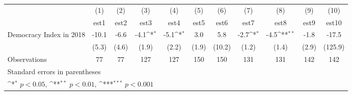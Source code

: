 {
\def\sym#1{\ifmmode^{#1}\else\(^{#1}\)\fi}
\begin{tabular}{l*{10}{c}}
\hline\hline
                    &\multicolumn{1}{c}{(1)}         &\multicolumn{1}{c}{(2)}         &\multicolumn{1}{c}{(3)}         &\multicolumn{1}{c}{(4)}         &\multicolumn{1}{c}{(5)}         &\multicolumn{1}{c}{(6)}         &\multicolumn{1}{c}{(7)}         &\multicolumn{1}{c}{(8)}         &\multicolumn{1}{c}{(9)}         &\multicolumn{1}{c}{(10)}         \\
                    &        est1         &        est2         &        est3         &        est4         &        est5         &        est6         &        est7         &        est8         &        est9         &       est10         \\
\hline
Democracy Index in 2018&       -10.1         &        -6.6         &        -4.1\sym{*}  &        -5.1\sym{*}  &         3.0         &         5.8         &        -2.7\sym{*}  &        -4.5\sym{**} &        -1.8         &       -17.5         \\
                    &       (5.3)         &       (4.6)         &       (1.9)         &       (2.2)         &       (1.9)         &      (10.2)         &       (1.2)         &       (1.4)         &       (2.9)         &     (125.9)         \\
\hline
Observations        &          77         &          77         &         127         &         127         &         150         &         150         &         131         &         131         &         142         &         142         \\
\hline\hline
\multicolumn{11}{l}{\footnotesize Standard errors in parentheses}\\
\multicolumn{11}{l}{\footnotesize \sym{*} \(p<0.05\), \sym{**} \(p<0.01\), \sym{***} \(p<0.001\)}\\
\end{tabular}
}
